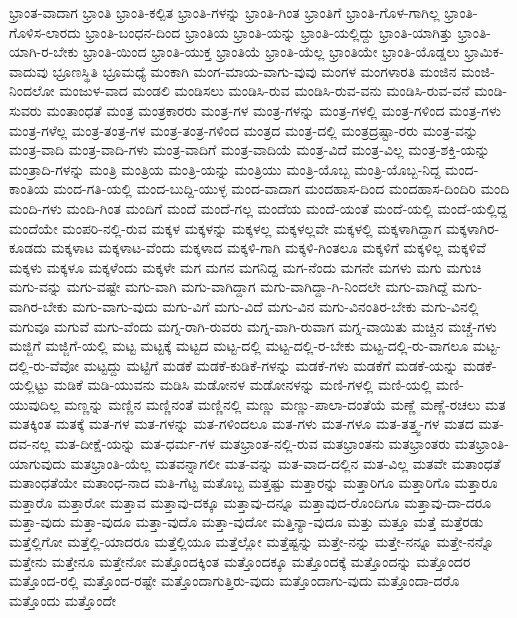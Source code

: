 {ಭ್ರಾಂತ-ವಾದಾಗ
ಭ್ರಾಂತಿ
ಭ್ರಾಂತಿ-ಕಲ್ಪಿತ
ಭ್ರಾಂತಿ-ಗಳನ್ನು
ಭ್ರಾಂತಿ-ಗಿಂತ
ಭ್ರಾಂತಿಗೆ
ಭ್ರಾಂತಿ-ಗೊಳ-ಗಾಗಿಲ್ಲ
ಭ್ರಾಂತಿ-ಗೊಳಿಸ-ಲಾರದು
ಭ್ರಾಂತಿ-ಬಂಧನ-ದಿಂದ
ಭ್ರಾಂತಿಯ
ಭ್ರಾಂತಿ-ಯನ್ನು
ಭ್ರಾಂತಿ-ಯಲ್ಲಿದ್ದು
ಭ್ರಾಂತಿ-ಯಾಗಿತ್ತು
ಭ್ರಾಂತಿ-ಯಾಗಿ-ರ-ಬೇಕು
ಭ್ರಾಂತಿ-ಯಿಂದ
ಭ್ರಾಂತಿ-ಯುಕ್ತ
ಭ್ರಾಂತಿಯೆ
ಭ್ರಾಂತಿ-ಯೆಲ್ಲ
ಭ್ರಾಂತಿಯೇ
ಭ್ರಾಂತಿ-ಯೊಡ್ಡಲು
ಭ್ರಾಮಿಕ-ವಾದುವು
ಭ್ರೂಣಸ್ಥಿತಿ
ಭ್ರೂಮಧ್ಯೆ
ಮಂಕಾಗಿ
ಮಂಗ-ಮಾಯ-ವಾಗು-ವುವು
ಮಂಗಳ
ಮಂಗಳಾರತಿ
ಮಂಜಿನ
ಮಂಜಿ-ನಿಂದಲೋ
ಮಂಜುಳ-ವಾದ
ಮಂಡಲಿ
ಮಂಡಿಸಲು
ಮಂಡಿಸಿ-ರುವ
ಮಂಡಿಸಿ-ರುವ-ವನು
ಮಂಡಿಸಿ-ರುವ-ವನೆ
ಮಂಡಿ-ಸುವರು
ಮಂತಾಂಧತೆ
ಮಂತ್ರ
ಮಂತ್ರಕಾರರು
ಮಂತ್ರ-ಗಳ
ಮಂತ್ರ-ಗಳನ್ನು
ಮಂತ್ರ-ಗಳಲ್ಲಿ
ಮಂತ್ರ-ಗಳಿಂದ
ಮಂತ್ರ-ಗಳು
ಮಂತ್ರ-ಗಳೆಲ್ಲ
ಮಂತ್ರ-ತಂತ್ರ-ಗಳ
ಮಂತ್ರ-ತಂತ್ರ-ಗಳಿಂದ
ಮಂತ್ರದ
ಮಂತ್ರ-ದಲ್ಲಿ
ಮಂತ್ರದ್ರಷ್ಟಾ-ರರು
ಮಂತ್ರ-ವನ್ನು
ಮಂತ್ರ-ವಾದಿ
ಮಂತ್ರ-ವಾದಿ-ಗಳು
ಮಂತ್ರ-ವಾದಿಗೆ
ಮಂತ್ರ-ವಾದಿಯೆ
ಮಂತ್ರ-ವಿದೆ
ಮಂತ್ರ-ವಿಲ್ಲ
ಮಂತ್ರ-ಶಕ್ತಿ-ಯನ್ನು
ಮಂತ್ರಾದಿ-ಗಳನ್ನು
ಮಂತ್ರಿ
ಮಂತ್ರಿಯ
ಮಂತ್ರಿ-ಯನ್ನು
ಮಂತ್ರಿಯು
ಮಂತ್ರಿ-ಯೊಬ್ಬ
ಮಂತ್ರಿ-ಯೊಬ್ಬ-ನಿದ್ದ
ಮಂದ-ಕಾಂತಿಯ
ಮಂದ-ಗತಿ-ಯಲ್ಲಿ
ಮಂದ-ಬುದ್ದಿ-ಯುಳ್ಳ
ಮಂದ-ವಾದಾಗ
ಮಂದಹಾಸ-ದಿಂದ
ಮಂದಹಾಸ-ದಿಂದಿರಿ
ಮಂದಿ
ಮಂದಿ-ಗಳು
ಮಂದಿ-ಗಿಂತ
ಮಂದಿಗೆ
ಮಂದೆ
ಮಂದೆ-ಗಲ್ಲ
ಮಂದೆಯ
ಮಂದೆ-ಯಂತೆ
ಮಂದೆ-ಯಲ್ಲಿ
ಮಂದೆ-ಯಲ್ಲಿದ್ದ
ಮಂದೆಯೇ
ಮಂಪರಿ-ನಲ್ಲಿ-ರುವ
ಮಕ್ಕಳ
ಮಕ್ಕಳನ್ನು
ಮಕ್ಕಳಲ್ಲ
ಮಕ್ಕಳಲ್ಲವೇ
ಮಕ್ಕಳಲ್ಲಿ
ಮಕ್ಕಳಾಗಿದ್ದಾಗ
ಮಕ್ಕಳಾಗಿರ-ಕೂಡದು
ಮಕ್ಕಳಾಟ
ಮಕ್ಕಳಾಟ-ವೆಂದು
ಮಕ್ಕಳಾದ
ಮಕ್ಕಳಿ-ಗಾಗಿ
ಮಕ್ಕಳಿ-ಗಿಂತಲೂ
ಮಕ್ಕಳಿಗೆ
ಮಕ್ಕಳಿಲ್ಲ
ಮಕ್ಕಳಿವೆ
ಮಕ್ಕಳು
ಮಕ್ಕಳೂ
ಮಕ್ಕಳೆಂದು
ಮಕ್ಕಳೇ
ಮಗ
ಮಗನ
ಮಗನಿದ್ದ
ಮಗ-ನೆಂದು
ಮಗನೇ
ಮಗಳು
ಮಗು
ಮಗುಚಿ
ಮಗು-ವನ್ನು
ಮಗು-ವಷ್ಟೇ
ಮಗು-ವಾಗಿ
ಮಗು-ವಾಗಿದ್ದಾಗ
ಮಗು-ವಾಗಿದ್ದಾ-ಗಿ-ನಿಂದಲೇ
ಮಗು-ವಾಗಿದ್ದೆ
ಮಗು-ವಾಗಿರ-ಬೇಕು
ಮಗು-ವಾಗು-ವುದು
ಮಗು-ವಿಗೆ
ಮಗು-ವಿದೆ
ಮಗು-ವಿನ
ಮಗು-ವಿನಂತಿರ-ಬೇಕು
ಮಗು-ವಿನಲ್ಲಿ
ಮಗುವೂ
ಮಗುವೆ
ಮಗು-ವೆಂದು
ಮಗ್ನ-ರಾಗಿ-ರುವರು
ಮಗ್ನ-ವಾಗಿ-ರುವಾಗ
ಮಗ್ನ-ವಾಯಿತು
ಮಚ್ಚಿನ
ಮಚ್ಚೆ-ಗಳು
ಮಜ್ಜಿಗೆ
ಮಜ್ಜಿಗೆ-ಯಲ್ಲಿ
ಮಟ್ಟ
ಮಟ್ಟಕ್ಕೆ
ಮಟ್ಟದ
ಮಟ್ಟ-ದಲ್ಲಿ
ಮಟ್ಟ-ದಲ್ಲಿ-ರ-ಬೇಕು
ಮಟ್ಟ-ದಲ್ಲಿ-ರು-ವಾಗಲೂ
ಮಟ್ಟ-ದಲ್ಲಿ-ರು-ವೆವೋ
ಮಟ್ಟದ್ದು
ಮಟ್ಟಿಗೆ
ಮಡಕೆ
ಮಡಕೆ-ಕುಡಿಕೆ-ಗಳನ್ನು
ಮಡಕೆ-ಗಳು
ಮಡಕೆಗೆ
ಮಡಕೆ-ಯನ್ನು
ಮಡಕೆ-ಯಲ್ಲಿಟ್ಟು
ಮಡಿಕೆ
ಮಡಿ-ಯುವನು
ಮಡಿಸಿ
ಮಡೋನಳ
ಮಡೋನಳನ್ನು
ಮಣಿ-ಗಳಲ್ಲಿ
ಮಣಿ-ಯಲ್ಲಿ
ಮಣಿ-ಯುವುದಿಲ್ಲ
ಮಣ್ಣನ್ನು
ಮಣ್ಣಿನ
ಮಣ್ಣಿನಂತೆ
ಮಣ್ಣಿನಲ್ಲಿ
ಮಣ್ಣು
ಮಣ್ಣು-ಪಾಲಾ-ದಂತೆಯೆ
ಮಣ್ಣೆ
ಮಣ್ಣೆ-ರಚಲು
ಮತ
ಮತಕ್ಕಿಂತ
ಮತಕ್ಕೆ
ಮತ-ಗಳ
ಮತ-ಗಳನ್ನು
ಮತ-ಗಳಿಂದಲೂ
ಮತ-ಗಳು
ಮತ-ಗಳೂ
ಮತ-ತತ್ತ್ವ-ಗಳ
ಮತದ
ಮತ-ದವ-ನಲ್ಲ
ಮತ-ದೀಕ್ಷೆ-ಯನ್ನು
ಮತ-ಧರ್ಮ-ಗಳ
ಮತಭ್ರಾಂತ-ನಲ್ಲಿ-ರುವ
ಮತಭ್ರಾಂತನು
ಮತಭ್ರಾಂತರು
ಮತಭ್ರಾಂತಿ-ಯಾಗುವುದು
ಮತಭ್ರಾಂತಿ-ಯೆಲ್ಲ
ಮತವನ್ನಾಗಲೀ
ಮತ-ವನ್ನು
ಮತ-ವಾದ-ದಲ್ಲಿನ
ಮತ-ವಿಲ್ಲ
ಮತವೇ
ಮತಾಂಧತೆ
ಮತಾಂಧತೆಯೇ
ಮತಾಂಧ-ನಾದ
ಮತಿ-ಗೆಟ್ಟ
ಮತೊಬ್ಬ
ಮತ್ತಷ್ಟು
ಮತ್ತಾರನ್ನು
ಮತ್ತಾರಿಗೂ
ಮತ್ತಾರಿಗೊ
ಮತ್ತಾರೂ
ಮತ್ತಾರೊ
ಮತ್ತಾರೋ
ಮತ್ತಾವ
ಮತ್ತಾವು-ದಕ್ಕೂ
ಮತ್ತಾವು-ದನ್ನೂ
ಮತ್ತಾವುದ-ರೊಂದಿಗೂ
ಮತ್ತಾವು-ದಾ-ದರೂ
ಮತ್ತಾ-ವುದು
ಮತ್ತಾ-ವುದೂ
ಮತ್ತಾ-ವುದೊ
ಮತ್ತಾ-ವುದೋ
ಮತ್ತಿನ್ಯಾ-ವುದೂ
ಮತ್ತು
ಮತ್ತೂ
ಮತ್ತೆ
ಮತ್ತೆರಡು
ಮತ್ತೆಲ್ಲಿಗೋ
ಮತ್ತೆಲ್ಲಿ-ಯಾದರೂ
ಮತ್ತೆಲ್ಲಿಯೂ
ಮತ್ತೆಲ್ಲೋ
ಮತ್ತೆಷ್ಟನ್ನು
ಮತ್ತೇ-ನನ್ನು
ಮತ್ತೇ-ನನ್ನೂ
ಮತ್ತೇ-ನನ್ನೊ
ಮತ್ತೇನು
ಮತ್ತೇನೂ
ಮತ್ತೇನೋ
ಮತ್ತೊಂದಕ್ಕಿಂತ
ಮತ್ತೊಂದಕ್ಕೂ
ಮತ್ತೊಂದಕ್ಕೆ
ಮತ್ತೊಂದನ್ನು
ಮತ್ತೊಂದರ
ಮತ್ತೊಂದ-ರಲ್ಲಿ
ಮತ್ತೊಂದ-ರಷ್ಟೇ
ಮತ್ತೊಂದಾಗುತ್ತಿರು-ವುದು
ಮತ್ತೊಂದಾಗು-ವುದು
ಮತ್ತೊಂದಾ-ದರೊ
ಮತ್ತೊಂದು
ಮತ್ತೊಂದೇ
}
